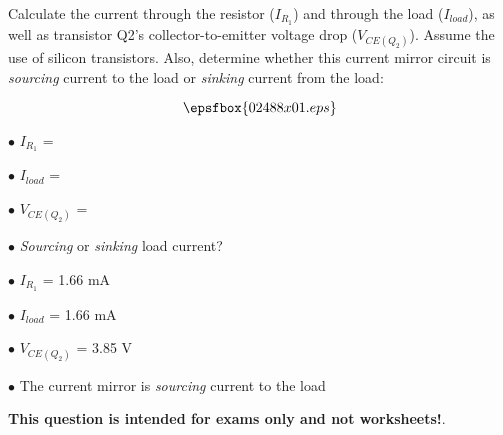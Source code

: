 

Calculate the current through the resistor ($I_{R_1}$) and through the load ($I_{load}$), as well as transistor Q2's collector-to-emitter voltage drop ($V_{CE(Q_2)}$).  Assume the use of silicon transistors.  Also, determine whether this current mirror circuit is {\it sourcing} current to the load or {\it sinking} current from the load:

$$\epsfbox{02488x01.eps}$$

\medskip
\item{$\bullet$} $I_{R_1}$ = 
\item{$\bullet$} $I_{load}$ = 
\item{$\bullet$} $V_{CE(Q_2)}$ = 
\item{$\bullet$} {\it Sourcing} or {\it sinking} load current?
\medskip







\medskip
\item{$\bullet$} $I_{R_1}$ = 1.66 mA
\item{$\bullet$} $I_{load}$ = 1.66 mA
\item{$\bullet$} $V_{CE(Q_2)}$ = 3.85 V
\item{$\bullet$} The current mirror is {\it sourcing} current to the load
\medskip







{\bf This question is intended for exams only and not worksheets!}.




